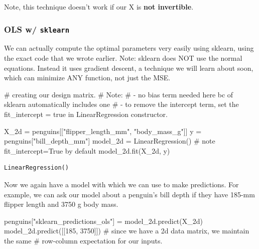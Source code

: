 \documentclass[
  letterpaper,
  DIV=11,
  numbers=noendperiod]{scrreprt}
\newenvironment{Shaded}{\begin{snugshade}}{\end{snugshade}}
\newcommand{\CommentTok}[1]{\textcolor[rgb]{0.37,0.37,0.37}{#1}}
\newcommand{\DecValTok}[1]{\textcolor[rgb]{0.68,0.00,0.00}{#1}}
\newcommand{\NormalTok}[1]{\textcolor[rgb]{0.00,0.23,0.31}{#1}}
\newcommand{\OperatorTok}[1]{\textcolor[rgb]{0.37,0.37,0.37}{#1}}
\newcommand{\StringTok}[1]{\textcolor[rgb]{0.13,0.47,0.30}{#1}}
\begin{document}
Note, this technique doesn't work if our X is \textbf{not invertible}.

\hypertarget{ols-w-sklearn}{%
\subsubsection{\texorpdfstring{OLS w/
\texttt{sklearn}}{OLS w/ sklearn}}\label{ols-w-sklearn}}

We can actually compute the optimal parameters very easily using
sklearn, using the exact code that we wrote earlier. Note: sklearn does
NOT use the normal equations. Instead it uses gradient descent, a
technique we will learn about soon, which can minimize ANY function, not
just the MSE.

\begin{Shaded}
\begin{Highlighting}[]
\CommentTok{\# creating our design matrix.}
\CommentTok{\# Note:}
\CommentTok{\#  {-} no bias term needed here bc of sklearn automatically includes one}
\CommentTok{\#  {-} to remove the intercept term, set the fit\_intercept = true in LinearRegression constructor.}

\NormalTok{X\_2d }\OperatorTok{=}\NormalTok{ penguins[[}\StringTok{"flipper\_length\_mm"}\NormalTok{, }\StringTok{"body\_mass\_g"}\NormalTok{]]}
\NormalTok{y }\OperatorTok{=}\NormalTok{ penguins[}\StringTok{"bill\_depth\_mm"}\NormalTok{]}
\NormalTok{model\_2d }\OperatorTok{=}\NormalTok{ LinearRegression() }\CommentTok{\# note fit\_intercept=True by default}
\NormalTok{model\_2d.fit(X\_2d, y)}
\end{Highlighting}
\end{Shaded}

\begin{verbatim}
LinearRegression()
\end{verbatim}

Now we again have a model with which we can use to make predictions. For
example, we can ask our model about a penguin's bill depth if they have
185-mm flipper length and 3750 g body mass.

\begin{Shaded}
\begin{Highlighting}[]
\NormalTok{penguins[}\StringTok{"sklearn\_predictions\_ols"}\NormalTok{] }\OperatorTok{=}\NormalTok{ model\_2d.predict(X\_2d)}
\NormalTok{model\_2d.predict([[}\DecValTok{185}\NormalTok{, }\DecValTok{3750}\NormalTok{]]) }
\CommentTok{\# since we have a 2d data matrix, we maintain the same }
\CommentTok{\# row{-}column expectation for our inputs. }
\end{Highlighting}
\end{Shaded}
\end{document}
